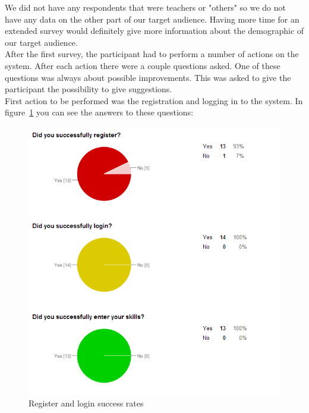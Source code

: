We did not have any respondents that were teachers or "others" so we do not have any data on the other part of our target audience.
Having more time for an extended survey would definitely give more information about the demographic of our target audience.\\

After the first survey, the participant had to perform a number of actions on the system.
After each action there were a couple questions asked.
One of these questions was always about possible improvements.
This was asked to give the participant the possibility to give suggestions.\\
First action to be performed was the registration and logging in to the system.
In figure~\ref{register_login_chart} you can see the answers to these questions:\\
\begin{figure}[h]
    \centering
    \includegraphics[width=\textwidth]{images/register_login_chart}
    \caption{Register and login success rates}
    \label{register_login_chart}
\end{figure}

